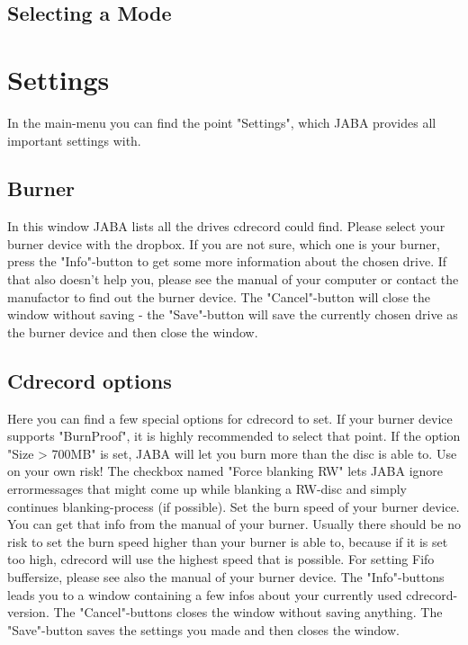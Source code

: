 \documentclass[a4paper,11pt]{article}
\begin{document}
\subsection{Selecting a Mode}

\section{Settings}

In the main-menu you can find the point "Settings", which JABA provides all important
settings with.

\subsection{Burner}

In this window JABA lists all the drives cdrecord could find. Please select your burner
device with the dropbox.
If you are not sure, which one is your burner, press the "Info"-button to get some more
information about the chosen drive.
If that also doesn't help you, please see the manual of your computer or contact the
manufactor to find out the burner device.
The "Cancel"-button will close the window without saving - the "Save"-button will save
the currently chosen drive as the burner device and then close the window.

\subsection{Cdrecord options}

Here you can find a few special options for cdrecord to set.
If your burner device supports "BurnProof", it is highly recommended to select that
point.
If the option "Size > 700MB" is set, JABA will let you burn more than the disc is able
to. Use on your own risk!
The checkbox named "Force blanking RW" lets JABA ignore errormessages that might
come up while blanking a RW-disc and simply continues blanking-process (if possible).
Set the burn speed of your burner device. You can get that info from the manual of your
burner. Usually there should be no risk to set the burn speed higher than your burner is
able to, because if it is set too high, cdrecord will use the highest speed that is possible.
For setting Fifo buffersize, please see also the manual of your burner device.
The "Info"-buttons leads you to a window containing a few infos about your currently
used cdrecord-version.
The "Cancel"-buttons closes the window without saving anything.
The "Save"-button saves the settings you made and then closes the window.
\end{document}
